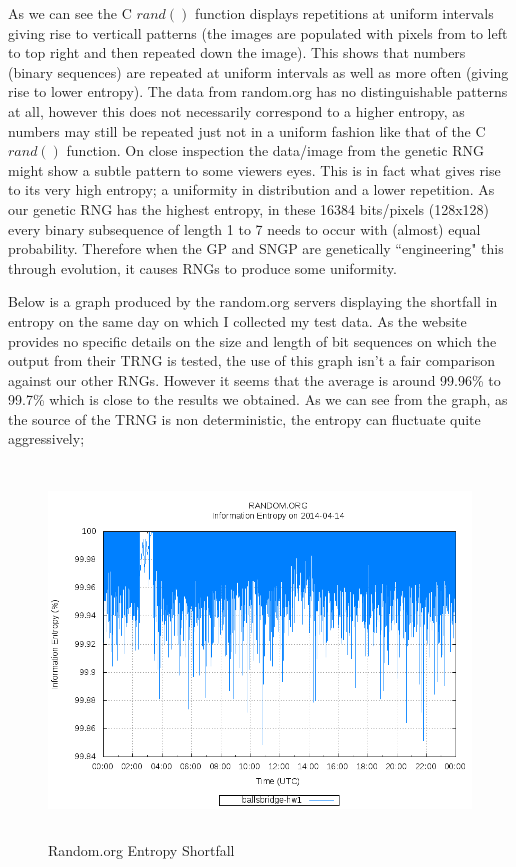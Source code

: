 \documentclass[a4paper,10.5pt]{article}
\begin{document}
As we can see the C $rand()$ function displays repetitions at uniform intervals giving rise to verticall patterns (the images are populated with pixels from to left to top right and then repeated down the image). This shows that numbers (binary sequences) are repeated at uniform intervals as well as more often (giving rise to lower entropy). The data from random.org has no distinguishable patterns at all, however this does not necessarily correspond to a higher entropy, as numbers may still be repeated just not in a uniform fashion like that of the C $rand()$ function. On close inspection the data/image from the genetic RNG might show a subtle pattern to some viewers eyes. This is in fact what gives rise to its very high entropy; a uniformity in distribution and a lower repetition. As our genetic RNG has the highest entropy, in these 16384 bits/pixels (128x128) every binary subsequence of length 1 to 7 needs to occur with (almost) equal probability. Therefore when the GP and SNGP are genetically ``engineering" this through evolution, it causes RNGs to produce some uniformity.

Below is a graph produced by the random.org servers displaying the shortfall in entropy on the same day on which I collected my test data. As the website provides no specific details on the size and length of bit sequences on which the output from their TRNG is tested, the use of this graph isn't a fair comparison against our other RNGs. However it seems that the average is around 99.96\% to 99.7\% which is close to the results we obtained. As we can see from the graph, as the source of the TRNG is non deterministic, the entropy can fluctuate quite aggressively;

\begin{figure}[H]
\label{trngpic}
\centering
\caption{Random.org Entropy Shortfall}
\includegraphics[keepaspectratio=true, height= 280pt]{trng.png}
\end{figure}
 
\end{document}
